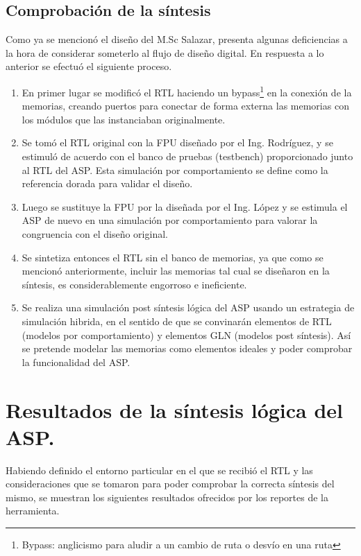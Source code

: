 \subsection{Comprobación de la síntesis}
\label{sec:comp_syn}
Como ya se mencionó el diseño del M.Sc Salazar, presenta algunas deficiencias a la hora de considerar someterlo al flujo de diseño digital. En respuesta a lo anterior se efectuó el siguiente proceso.

\begin{enumerate}

\item En primer lugar se modificó el RTL haciendo un bypass\footnote{Bypass: anglicismo para aludir a un cambio de ruta o desvío en una ruta} en la conexión de la memorias, creando puertos para conectar de forma externa las memorias con los módulos que las instanciaban originalmente.

\item Se tomó el RTL original con la FPU diseñado por el Ing. Rodríguez, y se estimuló de acuerdo con el banco de pruebas (testbench) proporcionado junto al RTL del ASP. Esta simulación por comportamiento se define como la referencia dorada para validar el diseño.

\item Luego se sustituye la FPU por la diseñada por el Ing. López y se estimula el ASP de nuevo en una simulación por comportamiento para valorar la congruencia con el diseño original.

\item Se sintetiza entonces el RTL sin el banco de memorias, ya que como se mencionó anteriormente, incluir las memorias tal cual se diseñaron en la síntesis, es considerablemente engorroso e ineficiente.

\item Se realiza una simulación post síntesis lógica del ASP usando un estrategia de simulación hibrida, en el sentido de que se convinarán elementos de RTL (modelos por comportamiento) y elementos GLN (modelos post síntesis). Así se pretende modelar las memorias como elementos ideales y poder comprobar la funcionalidad del ASP.
\end{enumerate}

\section{Resultados de la síntesis lógica del ASP.}

Habiendo definido el entorno particular en el que se recibió el RTL y las consideraciones que se tomaron para poder comprobar la correcta síntesis del mismo, se muestran los siguientes resultados ofrecidos por los reportes de la herramienta.

